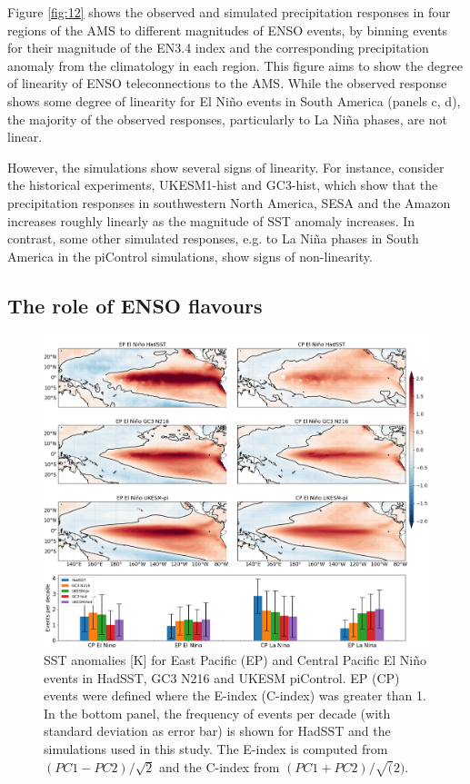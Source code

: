 




 Figure \ref{fig:12} shows the observed and simulated precipitation responses in four regions of the AMS to different magnitudes of ENSO events, by binning events for their magnitude of the EN3.4 index and the corresponding precipitation anomaly from the climatology in each region. This figure aims to show  the degree of linearity of ENSO teleconnections to the AMS.
While the observed response shows some degree of linearity for El Ni\~no events in South America (panels c, d), the majority of the observed responses, particularly to La Ni\~na phases, are not linear.

 However, the simulations show several signs of linearity. For instance, consider the historical experiments, UKESM1-hist and GC3-hist, which show that the precipitation responses in southwestern North America, SESA and the Amazon increases roughly linearly as the magnitude of SST anomaly increases. In contrast, some other simulated responses, e.g. to La Ni\~na phases in South America in the piControl simulations, show signs of non-linearity.



\subsection{The role of ENSO flavours}
  
\begin{figure}[b!]
\includegraphics[width=\linewidth]{figures/epcpmap}
\caption{SST anomalies [K] for East Pacific (EP) and Central Pacific El Niño events in HadSST, GC3 N216 and UKESM piControl. EP (CP) events were defined where the E-index (C-index) was greater than 1. In the bottom panel, the frequency of events per decade (with standard deviation as error bar) is shown for HadSST and the simulations used in this study.
The E-index is computed from $(PC1-PC2)/\sqrt{2}$ and the C-index from $(PC1+PC2)/\sqrt(2)$.
}
\label{fig:s1}
\end{figure}


